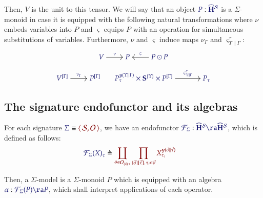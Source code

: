 Then, $V$ is the unit to this tensor. We will say that an object
$\Of{P}{\widehat{\HypCat}^\Sorts}$ is a $\Sigma$-monoid in case it is equipped
with the following natural transformations where $\nu$ embeds variables into $P$
and $\varsigma$ equips $P$ with an operation for simultaneous substitutions of
variables. Furthermore, $\nu$ and $\varsigma$ induce maps ${\nu}_{\Gamma}$ and
${\varsigma}^{\tau}_{\Upsilon\parallel\Gamma}$:
\begin{gather*}
  \begin{tikzcd}[cramped, ampersand replacement = \&]
    {\IMode{V}} \arrow[r, "\IMode\nu"]
    \&
    {\IMode{P}}
    \&
    {\IMode{P\odot P}}
      \arrow[l, swap, "\IMode\varsigma"]
  \end{tikzcd}\\[6pt]
  \begin{tikzcd}[cramped, ampersand replacement = \&]
    {\IMode{{V}^{[\Gamma]}}}
      \arrow[r, "\IMode{{\nu}_{\Gamma}}"]
    \&
    {\IMode{{P}^{[\Gamma]}}}
  \end{tikzcd}
  \qquad
  \begin{tikzcd}[cramped, sep = large, ampersand replacement = \&]
    {\IMode{{P_\tau^{\Yoneda{\Upsilon\parallel\Gamma}}\times \SymPsh^{\{\Upsilon\}}\times P^{[\Gamma]}}}}
      \arrow[r, "\IMode{\varsigma^\tau_{\Upsilon\parallel\Gamma}}"]
    \&
    {\IMode{P_\tau}}
  \end{tikzcd}
\end{gather*}

\subsection{The signature endofunctor and its algebras}

For each signature $\Match{\Sigma}{\Pair{\Sorts}{\Operators}}$, we have an
endofunctor
$\Of{\SigFun{\Sigma}}{\widehat{\HypCat}^\Sorts\ra\widehat{\HypCat}^\Sorts}$,
which is defined as follows:
\begin{align*}
  \IMode{{\SigFun{\Sigma}(X)}_{\tau}}
&
    \triangleq
    \OMode{
      \coprod_{
        \vartheta\in \Operators_{\MkArity{\vec{v}}{\tau}}
      }
      \prod_{
        \MkValence
          {\vec{\sigma}}
          {\vec{\tau}}
          {\tau_i}
        \in\vec{v}
      }
      X_{\tau_i}^{\Yoneda{\vec{\sigma}\parallel\vec{\tau}}}
    }
\end{align*}

Then, a $\Sigma$-model is a $\Sigma$-monoid $P$ which is equipped with an
algebra $\Of{\alpha}{\SigFun{\Sigma}(P)\ra P}$, which shall interpret
applications of each operator.


